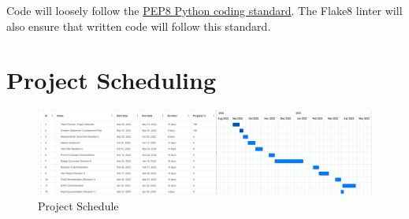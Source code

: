 \documentclass{article}
\begin{document}
Code will loosely follow the \href{https://peps.python.org/pep-0008/}{PEP8 Python coding standard}.
The Flake8 linter will also ensure that written code will follow this standard.

\section{Project Scheduling}

\begin{figure}[H] 
\centering
\includegraphics[width=1\textwidth]{Project Scheduling} 
\caption{Project Schedule} 
\label{Fig.Project_Scheduling} 
\end{figure}
\end{document}
